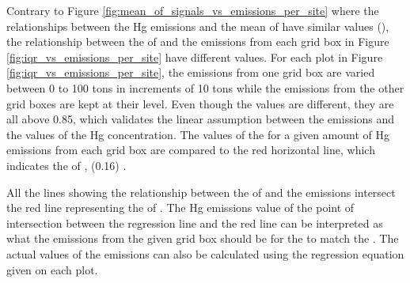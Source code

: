 \newpage
\begin{flushleft}
    Contrary to Figure \ref{fig:mean_of_signals_vs_emissions_per_site} where the relationships between the Hg emissions and the mean of \modelc have similar \rsq values (), the relationship between the \iq of \modelc  and the emissions from each grid box in Figure \ref{fig:iqr_vs_emissions_per_site} have different \rsq values. For each plot in Figure \ref{fig:iqr_vs_emissions_per_site}, the emissions from one grid box are varied between  0 to 100 tons in increments of 10 tons while the emissions from the other grid boxes are kept at their \on level. Even though the \rsq values are different, they are all above 0.85, which validates the linear assumption between the emissions and the \rsq values of the Hg concentration. The values of the \iq for a given amount of Hg emissions from each grid box are compared to the red horizontal line, which indicates the \iq of \obsC, (0.16) . 
    
\end{flushleft}
\begin{flushleft}
     All the lines showing the relationship between the \iq of \modelc and the emissions intersect the red line representing the \iq of \obsC. The Hg emissions value of the point of intersection between the regression line and the red line can be interpreted as what the emissions from the given grid box should be for the \modelc to match the \obsC. The actual values of the emissions can also be calculated using the regression equation given on each plot. 

\end{flushleft}

